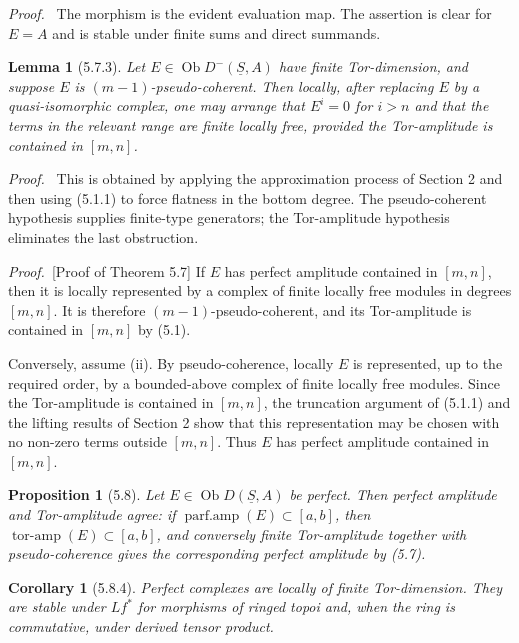 \documentclass[11pt]{article}
\theoremstyle{plain}
\newtheorem*{proposition*}{Proposition}
\newtheorem*{lemma*}{Lemma}
\newtheorem*{corollary*}{Corollary}
\theoremstyle{definition}
\theoremstyle{remark}
\newenvironment{prooftext}{\par\noindent\textit{Proof.}\ }{\par\medskip}
\DeclareMathOperator{\ob}{Ob}
\providecommand{\uS}{\underline{S}}
\begin{document}
\begin{prooftext}
The morphism is the evident evaluation map. The assertion is clear for $E=A$ and is stable under finite sums and direct summands.
\end{prooftext}

\begin{lemma*}[5.7.3]
Let $E\in\ob D^-(\uS,A)$ have finite Tor-dimension, and suppose $E$ is $(m-1)$-pseudo-coherent. Then locally, after replacing $E$ by a quasi-isomorphic complex, one may arrange that $E^i=0$ for $i>n$ and that the terms in the relevant range are finite locally free, provided the Tor-amplitude is contained in $[m,n]$.
\end{lemma*}

\begin{prooftext}
This is obtained by applying the approximation process of Section 2 and then using (5.1.1) to force flatness in the bottom degree. The pseudo-coherent hypothesis supplies finite-type generators; the Tor-amplitude hypothesis eliminates the last obstruction.
\end{prooftext}

\begin{prooftext}[Proof of Theorem 5.7]
If $E$ has perfect amplitude contained in $[m,n]$, then it is locally represented by a complex of finite locally free modules in degrees $[m,n]$. It is therefore $(m-1)$-pseudo-coherent, and its Tor-amplitude is contained in $[m,n]$ by (5.1).

Conversely, assume (ii). By pseudo-coherence, locally $E$ is represented, up to the required order, by a bounded-above complex of finite locally free modules. Since the Tor-amplitude is contained in $[m,n]$, the truncation argument of (5.1.1) and the lifting results of Section 2 show that this representation may be chosen with no non-zero terms outside $[m,n]$. Thus $E$ has perfect amplitude contained in $[m,n]$.
\end{prooftext}

\begin{proposition*}[5.8]
Let $E\in\ob D(\uS,A)$ be perfect. Then perfect amplitude and Tor-amplitude agree: if $\operatorname{parf.amp}(E)\subset[a,b]$, then $\operatorname{tor\text{-}amp}(E)\subset[a,b]$, and conversely finite Tor-amplitude together with pseudo-coherence gives the corresponding perfect amplitude by (5.7).
\end{proposition*}

\begin{corollary*}[5.8.4]
Perfect complexes are locally of finite Tor-dimension. They are stable under $Lf^*$ for morphisms of ringed topoi and, when the ring is commutative, under derived tensor product.
\end{corollary*}
\end{document}
